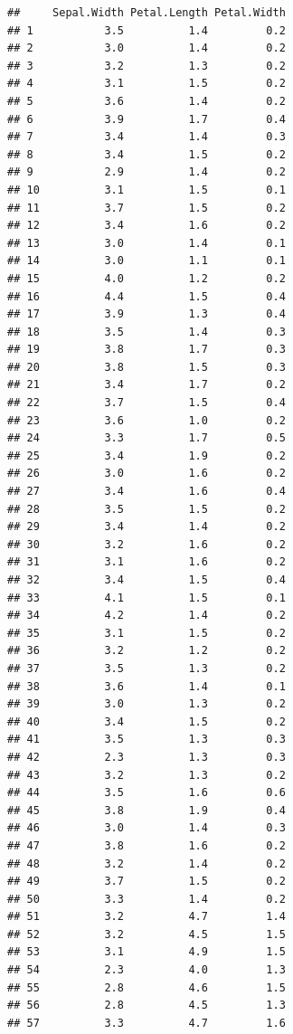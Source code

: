 \documentclass[
]{book}
\theoremstyle{definition}
\theoremstyle{definition}
\theoremstyle{definition}
\theoremstyle{definition}
\theoremstyle{remark}
\begin{document}
\begin{verbatim}
##     Sepal.Width Petal.Length Petal.Width
## 1           3.5          1.4         0.2
## 2           3.0          1.4         0.2
## 3           3.2          1.3         0.2
## 4           3.1          1.5         0.2
## 5           3.6          1.4         0.2
## 6           3.9          1.7         0.4
## 7           3.4          1.4         0.3
## 8           3.4          1.5         0.2
## 9           2.9          1.4         0.2
## 10          3.1          1.5         0.1
## 11          3.7          1.5         0.2
## 12          3.4          1.6         0.2
## 13          3.0          1.4         0.1
## 14          3.0          1.1         0.1
## 15          4.0          1.2         0.2
## 16          4.4          1.5         0.4
## 17          3.9          1.3         0.4
## 18          3.5          1.4         0.3
## 19          3.8          1.7         0.3
## 20          3.8          1.5         0.3
## 21          3.4          1.7         0.2
## 22          3.7          1.5         0.4
## 23          3.6          1.0         0.2
## 24          3.3          1.7         0.5
## 25          3.4          1.9         0.2
## 26          3.0          1.6         0.2
## 27          3.4          1.6         0.4
## 28          3.5          1.5         0.2
## 29          3.4          1.4         0.2
## 30          3.2          1.6         0.2
## 31          3.1          1.6         0.2
## 32          3.4          1.5         0.4
## 33          4.1          1.5         0.1
## 34          4.2          1.4         0.2
## 35          3.1          1.5         0.2
## 36          3.2          1.2         0.2
## 37          3.5          1.3         0.2
## 38          3.6          1.4         0.1
## 39          3.0          1.3         0.2
## 40          3.4          1.5         0.2
## 41          3.5          1.3         0.3
## 42          2.3          1.3         0.3
## 43          3.2          1.3         0.2
## 44          3.5          1.6         0.6
## 45          3.8          1.9         0.4
## 46          3.0          1.4         0.3
## 47          3.8          1.6         0.2
## 48          3.2          1.4         0.2
## 49          3.7          1.5         0.2
## 50          3.3          1.4         0.2
## 51          3.2          4.7         1.4
## 52          3.2          4.5         1.5
## 53          3.1          4.9         1.5
## 54          2.3          4.0         1.3
## 55          2.8          4.6         1.5
## 56          2.8          4.5         1.3
## 57          3.3          4.7         1.6

\end{verbatim}
\end{document}
